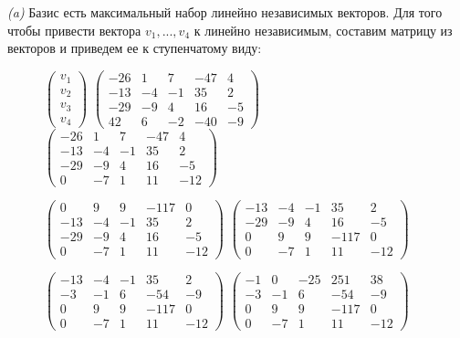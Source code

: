 \documentclass[10pt]{article}
\begin{document}
 \\ \\
 \textsl{(a)} Базис есть максимальный набор линейно независимых векторов. Для того чтобы привести вектора $v_1, ... , v_4$ к линейно независимым, составим матрицу из векторов и приведем ее к ступенчатому виду:
\begin{figure}[H]
	\raggedright
	$\begin{pmatrix}
		v_1 \\
		v_2 \\
		v_3 \\
		v_4
	\end{pmatrix}$
	\text{ = }
	$\begin{pmatrix}
		-26 & 1 & 7 & -47 & 4 \\
		-13 & -4 & -1 & 35 & 2 \\
		-29 & -9 & 4 & 16 & -5 \\
		42 & 6 & -2 & -40 & -9 
	\end{pmatrix}$
	\text{ = }
	$\begin{pmatrix}
		-26 & 1 & 7 & -47 & 4 \\
		-13 & -4 & -1 & 35 & 2 \\
		-29 & -9 & 4 & 16 & -5 \\
		0 & -7 & 1 & 11 & -12 
	\end{pmatrix}$
	\text{ = }

	\text{ = }
	$\begin{pmatrix}
		0 & 9 & 9 & -117 & 0 \\
		-13 & -4 & -1 & 35 & 2 \\
		-29 & -9 & 4 & 16 & -5 \\
		0 & -7 & 1 & 11 & -12 
	\end{pmatrix}$
	\text{ = }
	$\begin{pmatrix}
		-13 & -4 & -1 & 35 & 2 \\
		-29 & -9 & 4 & 16 & -5 \\
		0 & 9 & 9 & -117 & 0 \\
		0 & -7 & 1 & 11 & -12 
	\end{pmatrix}$
	\text{ = }	
	
	\text{ = }
	$\begin{pmatrix}
		-13 & -4 & -1 & 35 & 2 \\
		-3 & -1 & 6 & -54 & -9 \\
		0 & 9 & 9 & -117 & 0 \\
		0 & -7 & 1 & 11 & -12
	\end{pmatrix}$
	\text{ = }
	$\begin{pmatrix}
		-1 & 0 & -25 & 251 & 38 \\
		-3 & -1 & 6 & -54 & -9 \\
		0 & 9 & 9 & -117 & 0 \\
		0 & -7 & 1 & 11 & -12
	\end{pmatrix}$
	\text{ = }	


\end{figure}
\end{document}
